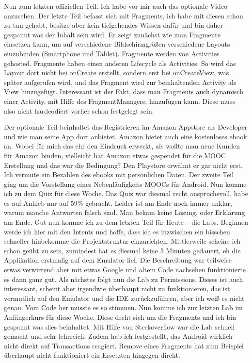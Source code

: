 \documentclass[12pt,a4paper,bibliography=totocnumbered,listof=totocnumbered]{scrartcl}
\begin{document}
Nun zum letzten offiziellen Teil. Ich habe vor mir auch das optionale Video anzusehen. 
Der letzte Teil befasst sich mit Fragments, ich habe mit diesen schon zu tun gehabt, besitze aber kein tiefgehendes Wissen dafür und bin daher gespannt was der Inhalt sein wird. 
Er zeigt zunächst wie man Fragmente einsetzen kann, um auf verschiedene Bildschirmgrößen verschiedene Layouts einzubinden (Smartphone und Tablet). Fragmente werden von Activities gehosted.  Fragmente haben einen anderen Lifecycle als Activities. So wird das Layout dort nicht bei onCreate erstellt, sondern erst bei onCreateView, was später aufgerufen wird, und das Fragment wird zur beinhaltenden Activity als View hinzugefügt. Interessant ist der Fakt, dass man Fragments auch dynamisch einer Activity, mit Hilfe des FragmentManagers, hinzufügen kann. Diese muss also nicht hardcodiert vorher schon festgelegt sein. 

Der optionale Teil beinhaltet das Registrieren im Amazon Appstore als Developer und wie man seine App dort anbietet. Amazon bietet auch eine kostenloses ebook an. Wobei für mich das ehr den Eindruck erweckt, als wollte man neue Kunden für Amazon binden, vielleicht hat Amazon etwas gespendet für die MOOC Erstellung und das war die Bedingung? Den Playstore erwähnt er gar nicht erst. Ich vermute ein Bezahlen des ebooks mit persönlichen Daten. Der zweite Teil ging um die Vorstellung eines Nebenläufigkeits MOOCs für Android. 
Nun komme ich zu dem Quiz für diese Woche.
Das Quiz war diesmal recht anspruchsvoll, habe es auf Anhieb nur auf 59\% gebracht. Leider ist am Ende noch immer unklar, warum manche Antworten falsch sind. Man bekam keine Lösung, oder Erklärung am Ende.
Gut nun komme ich zu dem letzten Teil für Heute – die Labs. Beginnen werde ich hier mit den Intents und hoffe, dass ich es inzwischen ein bisschen schneller hinbekomme die Projektstruktur einzurichten. 
Mittlerweile scheine ich schon geübt zu sein, zumindest hat es diesmal keine 5 Minuten gedauert, eh die Applikation erstmalig auf dem Emulator lief. Die Beschreibung war teilweise etwas verwirrend aber mit etwas Google und altem Code nachsehen funktionierte es dann ganz gut. 
Als nächstes folgt nun die Lab zu Permissions.
Dieses ist auch interessant, scheint aber irgendwie überhaupt nicht zu funktionieren, das ist vermutlich auf den Emulator und die IDE zurückzuführen, aber ich weiß es nicht genau. Vom Code her müsste es so stimmen. 
Nun komme ich zur letzten Lab im Anfängerkurs für diese Woche. Diese dreht sich um die Fragments und ich bin gespannt was dies beinhaltet. 
Mit Hilfe von Steckoverflow war die Lab schnell gemacht und sehr lehrreich. Zudem hab ich festgestellt, das Android wirklich nicht direkt auf Transactions reagiert. Remove eines Fragments hat zum Beispiel überhaupt nicht funktioniert ein Ersetzten hingegen direkt. 
\end{document}
